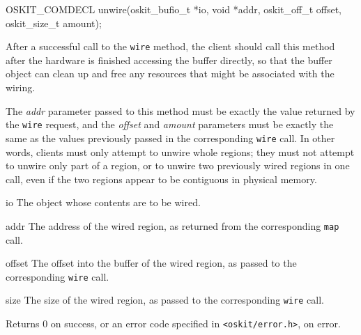 \begin{apisyn}

	\funcproto OSKIT_COMDECL
	unwire(oskit_bufio_t *io, void *addr,
	       oskit_off_t offset, oskit_size_t amount);
\end{apisyn}
\begin{apidesc}
	After a successful call to the \texttt{wire} method,
	the client should call this method
	after the hardware is finished accessing the buffer directly,
	so that the buffer object can clean up
	and free any resources that might be associated with the wiring.

	The \emph{addr} parameter passed to this method
	must be exactly the value returned by the \texttt{wire} request,
	and the \emph{offset} and \emph{amount} parameters
	must be exactly the same as the values previously passed
	in the corresponding \texttt{wire} call.
	In other words,
	clients must only attempt to unwire whole regions;
	they must not attempt to unwire only part of a region,
	or to unwire two previously wired regions in one call,
	even if the two regions appear to be contiguous in physical memory.
\end{apidesc}
\begin{apiparm}
	\item[io]
		The object whose contents are to be wired.
	\item[addr]
		The address of the wired region,
		as returned from the corresponding \texttt{map} call.
	\item[offset]
		The offset into the buffer of the wired region,
		as passed to the corresponding \texttt{wire} call.
	\item[size]
		The size of the wired region,
		as passed to the corresponding \texttt{wire} call.
\end{apiparm}
\begin{apiret}
	Returns 0 on success, or an error code specified in
	{\tt <oskit/error.h>}, on error.
\end{apiret}

